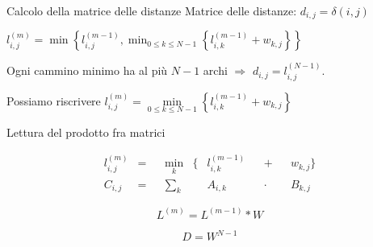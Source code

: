 \documentclass{beamer}
\theoremstyle{plain}
\theoremstyle{definition}
\theoremstyle{remark}
\newcommand{\set}[1]{\left\{#1\right\}}
\begin{document}
\begin{frame}{Calcolo della matrice delle distanze}
  Matrice delle distanze: $d_{i,j} = \delta(i,j)$
  \pause
  \vfill
  
  $l^{(m)}_{i,j} = \min\set{ l^{(m-1)} _{i,j} , \min _{0\le k\le N-1}
    \set{ l^{(m-1)} _{i,k} + w_{k,j}} }$
  \pause
  
  Ogni cammino minimo ha al pi\`u $N-1$ archi $\Rightarrow$ $d_{i,j} =
  l^{(N-1)} _{i,j}$.  \pause \vfill
  
  Possiamo riscrivere $l^{(m)}_{i,j} = \min \limits _{0\le k\le N-1}
  \set{ l^{(m-1)} _{i,k} + w_{k,j}}$
\end{frame}

\begin{frame}{Lettura del prodotto fra matrici}
  \begin{block}{}
    \begin{align*}
      l^{(m)}_{i,j} &=& & \min \limits _k & \Big\{ & l^{(m-1)}
      _{i,k} & & +  & & w_{k,j} \Big\} \\
      C_{i,j} &=& &\sum _k  & &  A_{i,k}  & & \cdot  & &B_{k,j} 
    \end{align*}
  \end{block}
  \pause
  
  \[ L^{(m)} = L^{(m-1)} * W \]

  \begin{block}{}
    \[ D = W^{N-1} \]
  \end{block}
\end{frame}
\end{document}
